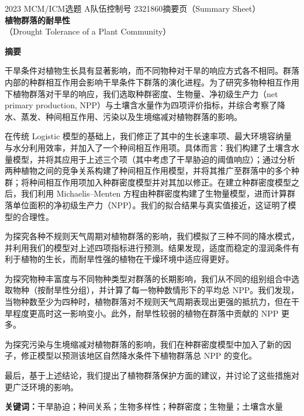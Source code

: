 \documentclass[11pt,a4paper]{ctexart}
\begin{document}
\thispagestyle{empty}
\begin{center}
{\small 2023 MCM/ICM\quad 选题 A\quad 队伍控制号 2321860\quad 摘要页（Summary Sheet）}\\[18pt]
{\LARGE\bfseries 植物群落的耐旱性}\\[8pt]
{\large （Drought Tolerance of a Plant Community）}\\[10pt]
\end{center}

\begin{center}
{\large\bfseries 摘\quad 要}
\end{center}

\vspace{6pt}
干旱条件对植物生长具有显著影响，而不同物种对干旱的响应方式各不相同。群落内部的种群相互作用会影响干旱条件下群落的演化进程。为了研究多物种相互作用下植物群落对干旱的响应，我们选取种群密度、生物量、净初级生产力（net primary production, NPP）与土壤含水量作为四项评价指标，并综合考察了降水、蒸发、种间相互作用、污染以及生境缩减对植物群落的影响。

在传统 Logistic 模型的基础上，我们修正了其中的生长速率项、最大环境容纳量与水分利用效率，并加入了一个种间相互作用项。具体而言：我们构建了土壤含水量模型，并将其应用于上述三个项（其中考虑了干旱胁迫的阈值响应）；通过分析两种植物之间的竞争关系构建了种间相互作用模型，并将其推广至群落中的多个种群；将种间相互作用项加入种群密度模型并对其加以修正。在建立种群密度模型之后，我们利用 Michaelis--Menten 方程由种群密度构建了生物量模型，进而计算群落单位面积的净初级生产力（NPP）。我们的拟合结果与真实值接近，这证明了模型的合理性。

为探究各种不规则天气周期对植物群落的影响，我们模拟了三种不同的降水模式，并利用我们的模型对上述四项指标进行预测。结果发现，适度而稳定的湿润条件有利于植物的生长，而耐旱性强的植物在干燥环境中适应得更好。

为探究物种丰富度与不同物种类型对群落的长期影响，我们从不同的组别组合中选取物种（按耐旱性分组），并计算了每一物种数情形下的平均总 NPP。我们发现，当物种数至少为四种时，植物群落对不规则天气周期表现出更强的抵抗力，但在干旱程度更高时这一影响变小。此外，耐旱性较弱的植物在群落中贡献的 NPP 更多。

为探究污染与生境缩减对植物群落的影响，我们在种群密度模型中加入了新的因子，修正模型以预测该地区自然降水条件下植物群落总 NPP 的变化。

最后，基于上述结论，我们提出了植物群落保护方面的建议，并讨论了这些措施对更广泛环境的影响。

\vspace{6pt}
\noindent\textbf{关键词：}干旱胁迫；种间关系；生物多样性；种群密度；生物量；土壤含水量
\end{document}

